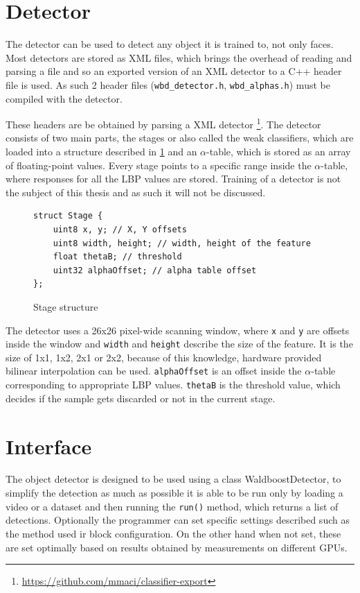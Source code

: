 \section{Detector}\label{sec:detector}

The detector can be used to detect any object it is trained to, not only faces. Most detectors are stored as XML files, which brings the overhead of reading and parsing a file and so an exported version of an XML detector to a C++ header file is used. As such 2 header files (\verb|wbd_detector.h|, \verb|wbd_alphas.h|) must be compiled with the detector.

These headers are be obtained by parsing a XML detector \footnote{\url{https://github.com/mmaci/classifier-export}}. The detector consists of two main parts, the stages or also called the weak classifiers, which are loaded into a structure described in \ref{fig:stage} and an $\alpha$-table, which is stored as an array of floating-point values. Every stage points to a specific range inside the $\alpha$-table, where responses for all the LBP values are stored. Training of a detector is not the subject of this thesis and as such it will not be discussed.

\begin{figure}[h!]
\begin{verbatim}
struct Stage {
    uint8 x, y; // X, Y offsets
    uint8 width, height; // width, height of the feature
    float thetaB; // threshold
    uint32 alphaOffset; // alpha table offset
};
\end{verbatim}
\caption{Stage structure}
\label{fig:stage}
\end{figure}

The detector uses a 26x26 pixel-wide scanning window, where \verb|x| and \verb|y| are offsets inside the window and \verb|width| and \verb|height| describe the size of the feature. It is the size of 1x1, 1x2, 2x1 or 2x2, because of this knowledge, hardware provided bilinear interpolation can be used. \verb|alphaOffset| is an offset inside the $\alpha$-table corresponding to appropriate LBP values. \verb|thetaB| is the threshold value, which decides if the sample gets discarded or not in the current stage.

\section{Interface}

The object detector is designed to be used using a class WaldboostDetector, to simplify the detection as much as possible it is able to be run only by loading a video or a dataset and then running the \verb|run()| method, which returns a list of detections. Optionally the programmer can set specific settings described such as the method used ir block configuration. On the other hand when not set, these are set optimally based on results obtained by measurements on different GPUs.

